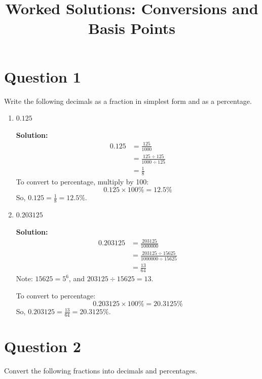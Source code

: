 \documentclass[12pt]{article}
\begin{document}
\title{Worked Solutions: Conversions and Basis Points}
\date{}
\maketitle

\section*{Question 1}
Write the following decimals as a fraction in simplest form and as a percentage.

\begin{enumerate}[label=(\alph*)]
    \item \( 0.125 \)
    
    \textbf{Solution:}
    \begin{align*}
        0.125 &= \frac{125}{1000} \\
              &= \frac{125 \div 125}{1000 \div 125} \\
              &= \frac{1}{8}
    \end{align*}
    To convert to percentage, multiply by 100:
    \[
    0.125 \times 100\% = 12.5\%
    \]
    So, \( 0.125 = \frac{1}{8} = 12.5\% \).

    \item \( 0.203125 \)
    
    \textbf{Solution:}
    \begin{align*}
        0.203125 &= \frac{203125}{1000000} \\
                 &= \frac{203125 \div 15625}{1000000 \div 15625} \\
                 &= \frac{13}{64}
    \end{align*}
    Note: \(15625 = 5^6\), and \(203125 \div 15625 = 13\).
    
    To convert to percentage:
    \[
    0.203125 \times 100\% = 20.3125\%
    \]
    So, \( 0.203125 = \frac{13}{64} = 20.3125\% \).
\end{enumerate}

\section*{Question 2}
Convert the following fractions into decimals and percentages.
\end{document}
